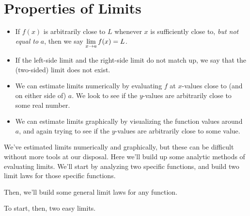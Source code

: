 \section{Properties of Limits}

\begin{recap}
  \begin{itemize}
    \item If $f(x)$ is arbitrarily close to $L$ whenever $x$ is sufficiently close to, \textit{but not equal to} $a$, then we say $\displaystyle \lim_{x\to a}f(x) = L$.
    \item If the left-side limit and the right-side limit do not match up, we say that the (two-sided) limit does not exist.
    \item We can estimate limits numerically by evaluating $f$ at $x$-values close to (and on either side of) $a$.
    We look to see if the $y$-values are arbitrarily close to some real number.
    \item We can estimate limits graphically by visualizing the function values around $a$, and again trying to see if the $y$-values are arbitrarily close to some value.
  \end{itemize}
\end{recap}

We've estimated limits numerically and graphically, but these can be difficult without more tools at our disposal.
Here we'll build up some analytic methods of evaluating limits.
We'll start by analyzing two specific functions, and build two limit laws for those specific functions.

Then, we'll build some general limit laws for any function.

To start, then, two easy limits.

